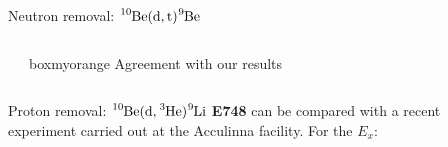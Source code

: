 \documentclass[sans,
frameno, %
mp,
usenames,dvipsnames, %
onlytextwidth, %
t,%
11pt]{beamer}
\newcommand{\iso}[2]{\ce{^{#1}#2}}
\begin{document}
\begin{frame}{Neutron removal: $\iso{10}{Be}(\textrm{d}, \textrm{t})\iso{9}{Be}$}
{\begin{columns}[c]
{            }
            \hfill
            {
                \begin{beamercolorbox}[sep=1ex, center, rounded=true]{boxmyorange}
                    Agreement with our results
                \end{beamercolorbox}
            }
        \end{columns}
    }
\end{frame}

\begin{frame}{Proton removal: $\iso{10}{Be}(\textrm{d}, \iso{3}{He})\iso{9}{Li}$}
    \textbf{E748} can be compared with a recent experiment carried out at the Acculinna facility. For the $E_{x}$:


\end{frame}
\end{document}
